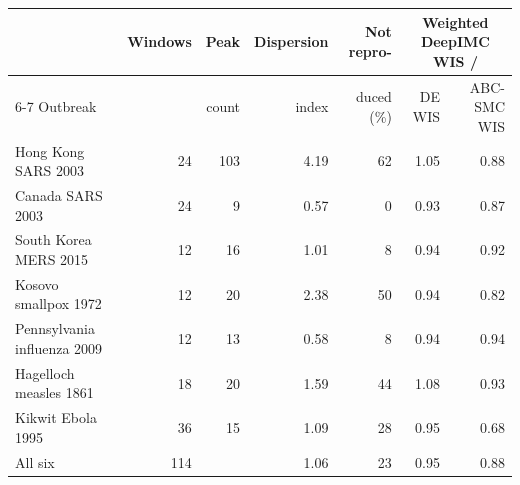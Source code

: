 \begin{tabular}{lrrrrrr}
\toprule
 & Windows & Peak & Dispersion & Not repro- & \multicolumn{2}{c}{Weighted DeepIMC WIS /} \\
\cmidrule(lr){6-7}
Outbreak &  & count & index & duced (\%) & DE WIS & ABC-SMC WIS \\
\midrule
Hong Kong SARS 2003 & 24 & 103 & 4.19 & 62 & 1.05 & 0.88 \\
\midrule
Canada SARS 2003 & 24 & 9 & 0.57 & 0 & 0.93 & 0.87 \\
South Korea MERS 2015 & 12 & 16 & 1.01 & 8 & 0.94 & 0.92 \\
Kosovo smallpox 1972 & 12 & 20 & 2.38 & 50 & 0.94 & 0.82 \\
Pennsylvania influenza 2009 & 12 & 13 & 0.58 & 8 & 0.94 & 0.94 \\
Hagelloch measles 1861 & 18 & 20 & 1.59 & 44 & 1.08 & 0.93 \\
Kikwit Ebola 1995 & 36 & 15 & 1.09 & 28 & 0.95 & 0.68 \\
\midrule
All six & 114 &  & 1.06 & 23 & 0.95 & 0.88 \\
\bottomrule
\end{tabular}
